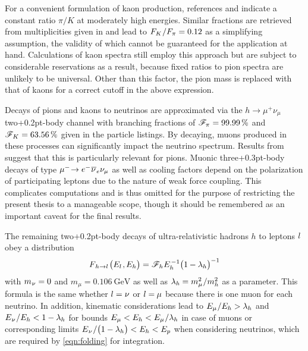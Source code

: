 \begin{spacing}{0.980}
	For a convenient formulation of kaon production, references \cite{Lykasov_2021} and \cite{Lykasov_2022} indicate a constant ratio
	$\pi / K$ at moderately high energies. Similar fractions are retrieved from multiplicities given in \cite{Koers_2006} and lead to
	$F_K \kern+0.5pt / F_\pi = \num{0.12}$ as a simplifying assumption, the validity of which cannot be guaranteed for the application
	at hand. Calculations of kaon spectra still employ this approach but are subject to considerable reservations as a result, because
	fixed ratios to pion spectra are unlikely to be universal. Other than this factor, the pion mass is replaced with that of kaons for
	a correct cutoff in the above expression.
	
	Decays of pions and kaons to neutrinos are approximated via the $h \rightarrow \mu^+ \nu_\mu$ two{\kern+0.2pt}-body channel
	with branching fractions of $\mathscr{F}_{\kern-0.2pt \pi \kern+0.2pt} = \qty{99.99}{\percent}$ and
	$\mathscr{F}_{\kern+0.3pt K \kern+0.2pt} = \qty{63.56}{\percent}$ given in the \cite{pdg}
	particle listings. By decaying, muons produced in these processes can significantly impact the neutrino spectrum. Results from
	\cite{Carpio_2020} suggest that this is particularly relevant for pions. Muonic three{\kern+0.3pt}-body decays of type
	$\mu^- \kern-2.5pt \kern+0.5pt \rightarrow e^- \kern+0.5pt \overline{\kern-0.2pt \nu \kern+0.8pt}_e \nu_\mu$ as well as
	cooling factors depend on the polarization of participating leptons due to the nature of weak force coupling. This complicates
	computations and is thus omitted for the purpose of restricting the present thesis to a manageable scope, though it should be
	remembered as an important caveat for the final results.
	
	The remaining two{\kern+0.2pt}-body decays of ultra-relativistic hadrons $h$ to leptons $l \kern+1.0pt$ obey a distribution
	\begin{equation*}
		F_{\kern+1.0pt h \kern+0.2pt \rightarrow l \kern+1.0pt} \bigl( E_l \kern+0.8pt, \kern-0.2pt E_h \bigr) =
		\mathscr{F}_{\kern+0.2pt h \kern+0.2pt} E_h^{\kern+1.0pt -1} \bigl( 1 \kern-0.3pt - \lambda_h \bigr)^{-1}
	\end{equation*}
	with $m_{\kern+0.5pt \nu} = 0$ and $m_\mu = \qty{0.106}{\giga\electronvolt}$ \cite{pdg} as well as
	$\lambda_h \kern-0.3pt = m_\mu^2 \kern+0.5pt / m_h^2$ as a parameter. This formula is the same whether
	$l = \nu \kern+0.2pt$ or $l = \kern-0.3pt \mu$ because there is one muon for each neutrino. In addition,
	kinematic considerations lead to $E_\mu \kern+0.5pt / E_h > \lambda_h$ and
	$E_{\kern+0.5pt \nu} \kern+0.5pt / E_h < 1 - \lambda_h$ for bounds
	$E_\mu < E_h < E_\mu \kern+0.5pt / \lambda_h$ in case of muons or corresponding limits
	$E_{\kern+0.5pt \nu} \kern+0.5pt / \smash{\bigl( 1 - \lambda_h \bigr)} < E_h < E_p$ when considering neutrinos, which are
	required by \eqref{eqn:folding} for integration.
	

\end{spacing}
